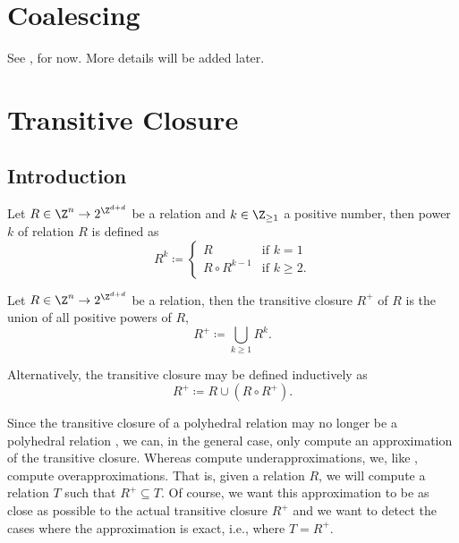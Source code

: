 \section{Coalescing}\label{s:coalescing}

See , for now.
More details will be added later.

\section{Transitive Closure}

\subsection{Introduction}

\begin{definition}
Let $R \in \Z^n \to 2^{\Z^{d+d}}$ be a relation and
$k \in \Z_{\ge 1}$
a positive number, then power $k$ of relation $R$ is defined as
\begin{equation}
\label{eq:transitive:power}
R^k \coloneqq
\begin{cases}
R & \text{if $k = 1$}
\\
R \circ R^{k-1} & \text{if $k \ge 2$}
.
\end{cases}
\end{equation}
\end{definition}

\begin{definition}
Let $R \in \Z^n \to 2^{\Z^{d+d}}$ be a relation,
then the transitive closure $R^+$ of $R$ is the union
of all positive powers of $R$,
$$
R^+ \coloneqq \bigcup_{k \ge 1} R^k
.
$$
\end{definition}
Alternatively, the transitive closure may be defined
inductively as
\begin{equation}
\label{eq:transitive:inductive}
R^+ \coloneqq R \cup \left(R \circ R^+\right)
.
\end{equation}

Since the transitive closure of a polyhedral relation
may no longer be a polyhedral relation ,
we can, in the general case, only compute an approximation
of the transitive closure.
Whereas  compute underapproximations,
we, like , compute overapproximations.
That is, given a relation $R$, we will compute a relation $T$
such that $R^+ \subseteq T$.  Of course, we want this approximation
to be as close as possible to the actual transitive closure
$R^+$ and we want to detect the cases where the approximation is
exact, i.e., where $T = R^+$.


